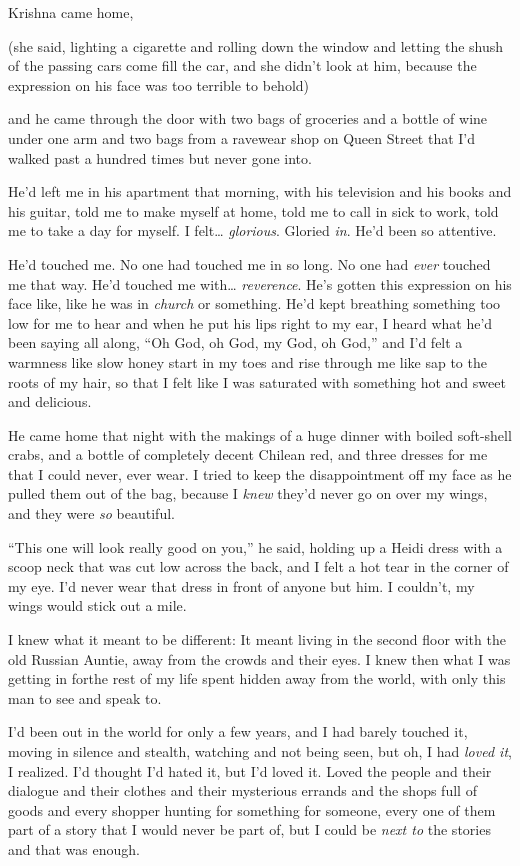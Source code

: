 Krishna came home,

(she said, lighting a cigarette and rolling down the window and
letting the shush of the passing cars come fill the car, and she
didn't look at him, because the expression on his face was too
terrible to behold)

and he came through the door with two bags of groceries and a bottle
of wine under one arm and two bags from a ravewear shop on Queen
Street that I'd walked past a hundred times but never gone into.

He'd left me in his apartment that morning, with his television and
his books and his guitar, told me to make myself at home, told me to
call in sick to work, told me to take a day for myself.  I felt\ldots{} 
\textit{glorious}.  Gloried \textit{in}.  He'd been so attentive.

He'd touched me.  No one had touched me in so long.  No one had
\textit{ever} touched me that way.  He'd touched me with\ldots{} 
\textit{reverence}.  He's gotten this expression on his face like,
like he was in \textit{church} or something.  He'd kept breathing
something too low for me to hear and when he put his lips right to my
ear, I heard what he'd been saying all along, ``Oh God, oh God, my
God, oh God,'' and I'd felt a warmness like slow honey start in my
toes and rise through me like sap to the roots of my hair, so that I
felt like I was saturated with something hot and sweet and delicious.

He came home that night with the makings of a huge dinner with boiled
soft-shell crabs, and a bottle of completely decent Chilean red, and
three dresses for me that I could never, ever wear.  I tried to keep
the disappointment off my face as he pulled them out of the bag,
because I \textit{knew} they'd never go on over my wings, and they
were \textit{so} beautiful.

``This one will look really good on you,'' he said, holding up a Heidi
dress with a scoop neck that was cut low across the back, and I felt a
hot tear in the corner of my eye.  I'd never wear that dress in front
of anyone but him.  I couldn't, my wings would stick out a mile.

I knew what it meant to be different:  It meant living in the second
floor with the old Russian Auntie, away from the crowds and their
eyes.  I knew then what I was getting in for\dash{}the rest of my life
spent hidden away from the world, with only this man to see and speak
to.

I'd been out in the world for only a few years, and I had barely
touched it, moving in silence and stealth, watching and not being
seen, but oh, I had \textit{loved it}, I realized.  I'd thought I'd
hated it, but I'd loved it.  Loved the people and their dialogue and
their clothes and their mysterious errands and the shops full of goods
and every shopper hunting for something for someone, every one of them
part of a story that I would never be part of, but I could be
\textit{next to} the stories and that was enough.

